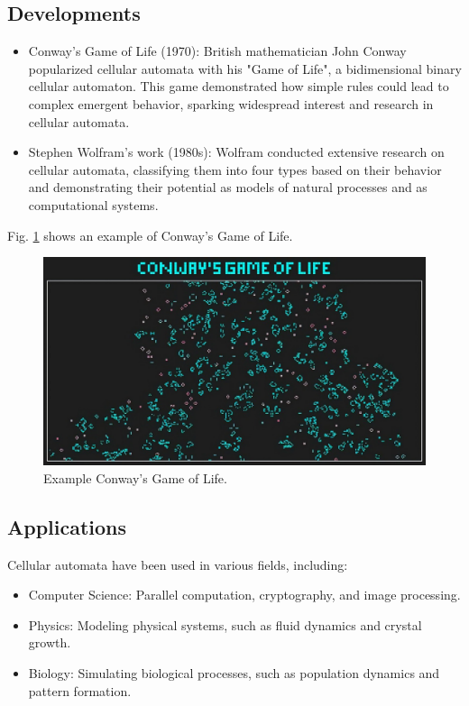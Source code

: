 \documentclass[9pt,a4paper,twoside]{tau-class/tau}
\begin{document}
    \subsection{Developments}
    \begin{itemize}
        \item Conway's Game of Life (1970): British mathematician John Conway popularized cellular
        automata with his "Game of Life", a bidimensional binary cellular automaton. 
        This game demonstrated how simple rules could lead to complex emergent behavior, 
        sparking widespread interest and research in cellular automata.

        \item Stephen Wolfram's work (1980s): Wolfram conducted extensive research on cellular
        automata, classifying them into four types based on their behavior and demonstrating 
        their potential as models of natural processes and as computational systems.
    \end{itemize}

    Fig. \ref{fig:figure} shows an example of Conway's Game of Life.
	\begin{figure}[H]
		\centering
		\includegraphics[width=0.75\columnwidth]{figures/gameOfLife.jpg}
		\caption{Example Conway's Game of Life.}
		\label{fig:figure}
	\end{figure}

    \subsection{Applications}
	
        Cellular automata have been used in various fields, including:
        
        \begin{itemize}
            \item Computer Science: Parallel computation, cryptography, and image processing.
            \item Physics: Modeling physical systems, such as fluid dynamics and crystal growth.
            \item Biology: Simulating biological processes, such as population dynamics and pattern formation.
        \end{itemize}
		
\end{document}
